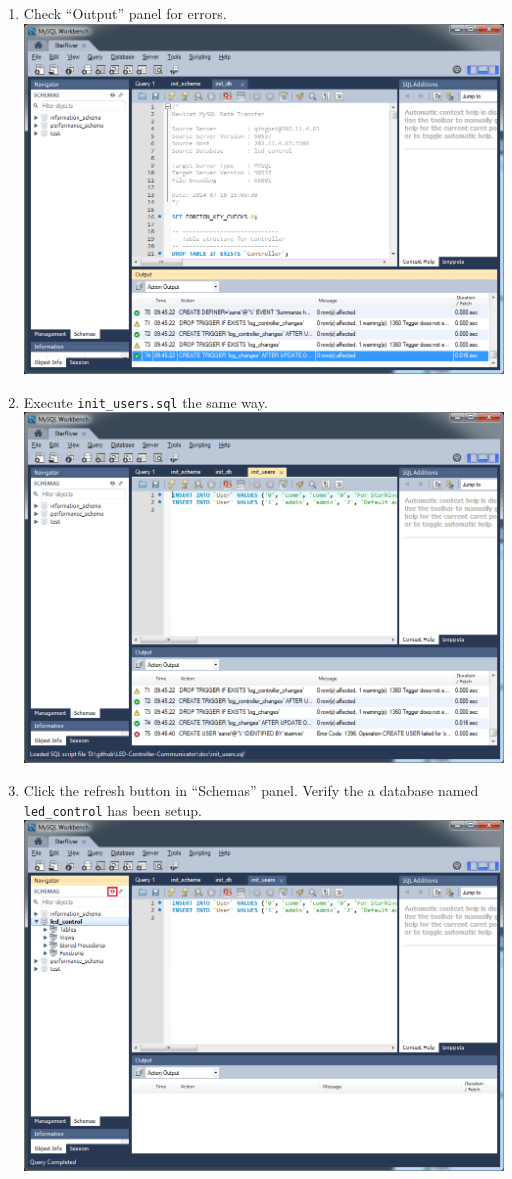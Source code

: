 \begin{enumerate}
\item
  Check ``Output'' panel for errors.
  \includegraphics{../img/db_init_10.png}
\item
  Execute \texttt{init\_users.sql} the same way.
  \includegraphics{../img/db_init_11.png}
\item
  Click the refresh button in ``Schemas'' panel. Verify the a database
  named \texttt{led\_control} has been setup.
  \includegraphics{../img/db_init_12.png}
\end{enumerate}

